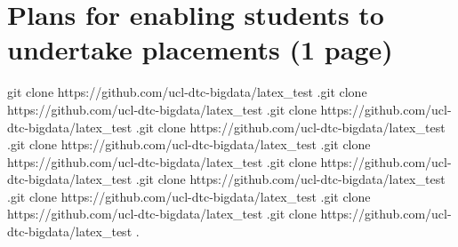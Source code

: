 \documentclass[a4paper,onecolumn,11pt]{article}
\begin{document}
\section*{Plans for enabling students to undertake placements (1 page)}

git clone https://github.com/ucl-dtc-bigdata/latex_test .git clone https://github.com/ucl-dtc-bigdata/latex_test .git clone https://github.com/ucl-dtc-bigdata/latex_test .git clone https://github.com/ucl-dtc-bigdata/latex_test .git clone https://github.com/ucl-dtc-bigdata/latex_test .git clone https://github.com/ucl-dtc-bigdata/latex_test .git clone https://github.com/ucl-dtc-bigdata/latex_test .git clone https://github.com/ucl-dtc-bigdata/latex_test .git clone https://github.com/ucl-dtc-bigdata/latex_test .git clone https://github.com/ucl-dtc-bigdata/latex_test .git clone https://github.com/ucl-dtc-bigdata/latex_test .
\end{document}
